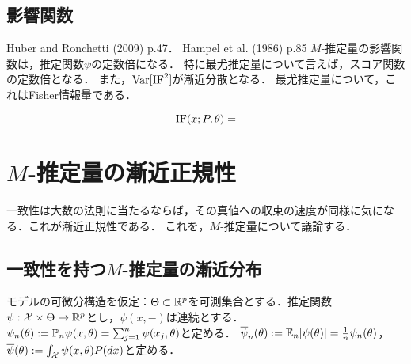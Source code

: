 \documentclass[uplatex,dvipdfmx]{jsreport}
\begin{document}
\subsection{影響関数}

\begin{tcolorbox}[colframe=ForestGreen, colback=ForestGreen!10!white,breakable,colbacktitle=ForestGreen!40!white,coltitle=black,fonttitle=\bfseries\sffamily,
title=]
    Huber and Ronchetti (2009)\cite{Huber} p.47．
    Hampel et al. (1986) p.85\cite{Hampel}
    $M$-推定量の影響関数は，推定関数$\psi$の定数倍になる．
    特に最尤推定量について言えば，スコア関数の定数倍となる．
    また，$\mathrm{Var}[\mathrm{IF}^2]$が漸近分散となる．
    最尤推定量について，これはFisher情報量である．
\end{tcolorbox}

\begin{theorem}
    \[\mathrm{IF}(x;P,\theta)=\]
\end{theorem}

\section{$M$-推定量の漸近正規性}

\begin{tcolorbox}[colframe=ForestGreen, colback=ForestGreen!10!white,breakable,colbacktitle=ForestGreen!40!white,coltitle=black,fonttitle=\bfseries\sffamily,
title=]
    一致性は大数の法則に当たるならば，その真値への収束の速度が同様に気になる．これが漸近正規性である．
    これを，$M$-推定量について議論する．
\end{tcolorbox}

\subsection{一致性を持つ$M$-推定量の漸近分布}

\begin{notation}
    モデルの可微分構造を仮定：$\Theta\subset\mathbb{R}^p$を可測集合とする．推定関数$\psi:\mathcal{X}\times\Theta\to\mathbb{R}^p$とし，$\psi(x,-)$は連続とする．
    $\psi_n(\theta):=\mathbb{P}_n\psi(x,\theta)=\sum_{j=1}^n\psi(x_j,\theta)$と定める．
    $\overline{\psi}_n(\theta):=\mathbb{E}_n[\psi(\theta)]=\frac{1}{n}\psi_n(\theta)$，
    $\overline{\psi}(\theta):=\int_{\mathcal{X}}\psi(x,\theta)P(dx)$と定める．
\end{notation}
\end{document}
